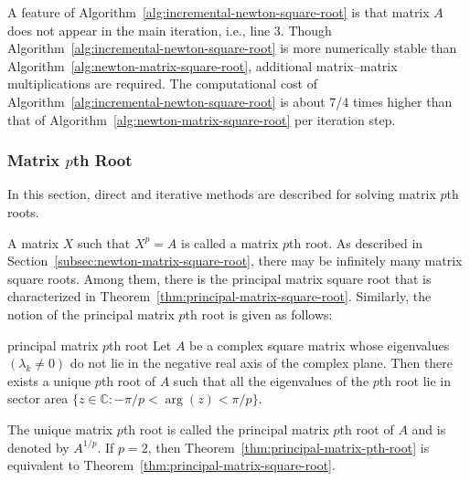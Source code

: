 {A feature of Algorithm~\ref{alg:incremental-newton-square-root} is that matrix $A$ does not appear in the main iteration, i.e., line 3. Though Algorithm~\ref{alg:incremental-newton-square-root} is more numerically stable than Algorithm~\ref{alg:newton-matrix-square-root}, additional matrix--matrix multiplications are required. The computational cost of Algorithm~\ref{alg:incremental-newton-square-root} is about 7/4 times higher than that of Algorithm~\ref{alg:newton-matrix-square-root} per iteration step.}

\subsubsection{{Matrix $p$th Root}}\label{subsec:matrix-pth-root}

{In this section, direct and iterative methods are described for solving matrix $p$th roots.}

{A matrix $X$ such that $X^p=A$ is called a matrix $p$th root. As described in Section~\ref{subsec:newton-matrix-square-root}, there may be infinitely many matrix square roots. Among them, there is the principal matrix square root that is characterized in Theorem~\ref{thm:principal-matrix-square-root}. Similarly, the notion of the principal matrix $p$th root is given as follows:}

\begin{Theorem}{{principal matrix $p$th root}}\label{thm:principal-matrix-pth-root}
{Let $A$ be a complex square matrix whose eigenvalues $(\lambda_k\ne0)$ do not lie in the negative real axis of the complex plane. Then there exists a unique $p$th root of $A$ such that all the eigenvalues of the $p$th root lie in sector area $\{z\in\mathbb{C}:-\pi/p<\arg(z)<\pi/p\}$.}
\end{Theorem}

{The unique matrix $p$th root is called the principal matrix $p$th root of $A$ and is denoted by $A^{1/p}$. If $p=2$, then Theorem~\ref{thm:principal-matrix-pth-root} is equivalent to Theorem~\ref{thm:principal-matrix-square-root}.}

